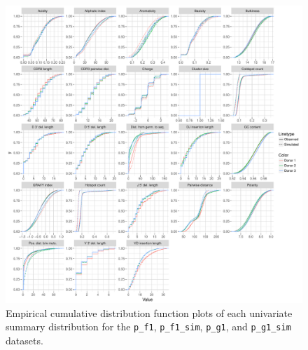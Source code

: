 \documentclass{article}
\begin{document}
\begin{figure}
    \includegraphics[width=\linewidth]{Figures/PartisScores/partis_ecdf.pdf}
    \caption{Empirical cumulative distribution function plots of each univariate summary distribution for the \texttt{p\_f1}, \texttt{p\_f1\_sim}, \texttt{p\_g1}, and \texttt{p\_g1\_sim} datasets.}
    \label{fig:PartisECDFs}
\end{figure}
\end{document}
